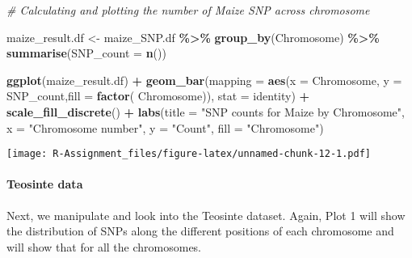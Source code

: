 \documentclass[
]{article}
\newenvironment{Shaded}{\begin{snugshade}}{\end{snugshade}}
\newcommand{\AttributeTok}[1]{\textcolor[rgb]{0.13,0.29,0.53}{#1}}
\newcommand{\CommentTok}[1]{\textcolor[rgb]{0.56,0.35,0.01}{\textit{#1}}}
\newcommand{\ConstantTok}[1]{\textcolor[rgb]{0.56,0.35,0.01}{#1}}
\newcommand{\FunctionTok}[1]{\textcolor[rgb]{0.13,0.29,0.53}{\textbf{#1}}}
\newcommand{\NormalTok}[1]{#1}
\newcommand{\OtherTok}[1]{\textcolor[rgb]{0.56,0.35,0.01}{#1}}
\newcommand{\SpecialCharTok}[1]{\textcolor[rgb]{0.81,0.36,0.00}{\textbf{#1}}}
\newcommand{\StringTok}[1]{\textcolor[rgb]{0.31,0.60,0.02}{#1}}
\begin{document}
\begin{Shaded}
\begin{Highlighting}[]
\CommentTok{\# Calculating and plotting the number of Maize SNP across chromosome}

\NormalTok{maize\_result.df }\OtherTok{\textless{}{-}}\NormalTok{ maize\_SNP.df }\SpecialCharTok{\%\textgreater{}\%}
  \FunctionTok{group\_by}\NormalTok{(Chromosome) }\SpecialCharTok{\%\textgreater{}\%}
  \FunctionTok{summarise}\NormalTok{(}\AttributeTok{SNP\_count =} \FunctionTok{n}\NormalTok{())}


\FunctionTok{ggplot}\NormalTok{(maize\_result.df) }\SpecialCharTok{+}
  \FunctionTok{geom\_bar}\NormalTok{(}\AttributeTok{mapping =} \FunctionTok{aes}\NormalTok{(}\AttributeTok{x =}\NormalTok{ Chromosome, }\AttributeTok{y =}\NormalTok{ SNP\_count,}\AttributeTok{fill =} \FunctionTok{factor}\NormalTok{( Chromosome)), }\AttributeTok{stat =} \StringTok{\textquotesingle{}identity\textquotesingle{}}\NormalTok{) }\SpecialCharTok{+} \FunctionTok{scale\_fill\_discrete}\NormalTok{() }\SpecialCharTok{+}
  \FunctionTok{labs}\NormalTok{(}\AttributeTok{title =} \StringTok{"SNP counts for Maize by Chromosome"}\NormalTok{,}
       \AttributeTok{x =} \StringTok{"Chromosome number"}\NormalTok{,}
       \AttributeTok{y =} \StringTok{"Count"}\NormalTok{,}
       \AttributeTok{fill =} \StringTok{"Chromosome"}\NormalTok{)}
\end{Highlighting}
\end{Shaded}

\texttt{[image: R-Assignment\_files/figure-latex/unnamed-chunk-12-1.pdf]}

\paragraph{Teosinte data}\label{teosinte-data-1}

Next, we manipulate and look into the Teosinte dataset. Again, Plot 1
will show the distribution of SNPs along the different positions of each
chromosome and will show that for all the chromosomes.

\begin{Shaded}
\end{Shaded}
\end{document}
